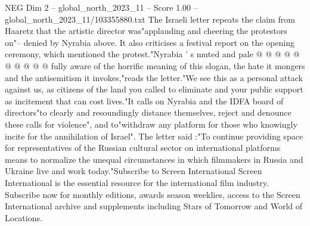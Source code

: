 \begin{textsample}{NEG Dim 2 – global\_north\_2023\_11 – Score 1.00 – global\_north\_2023\_11/103355880.txt}
The Israeli letter repeats the claim from Haaretz that the artistic director was"applauding and cheering the protestors on"-- denied by Nyrabia above.
It also criticises a festival report on the opening ceremony, which mentioned the protest."Nyrabia ' s muted and pale @ @ @ @ @ @ @ @ @ @ fully aware of the horrific meaning of this slogan, the hate it mongers and the antisemitism it invokes,"reads the letter."We see this as a personal attack against us, as citizens of the land you called to eliminate and your public support as incitement that can cost lives."It calls on Nyrabia and the IDFA board of directors"to clearly and resoundingly distance themselves, reject and denounce these calls for violence", and to"withdraw any platform for those who knowingly incite for the annihilation of Israel".
The letter said :"To continue providing space for representatives of the Russian cultural sector on international platforms means to normalize the unequal circumstances in which filmmakers in Russia and Ukraine live and work today."Subscribe to Screen International Screen International is the essential resource for the international film industry.
Subscribe now for monthly editions, awards season weeklies, access to the Screen International archive and supplements including Stars of Tomorrow and World of Locations.

\end{textsample}
